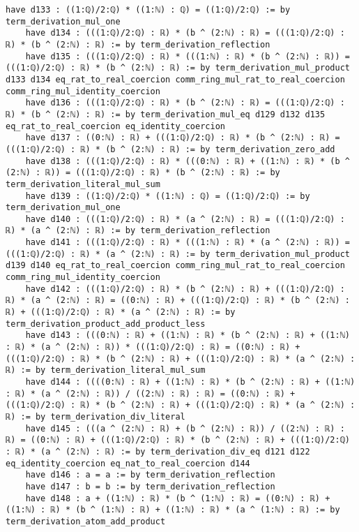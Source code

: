 \documentclass{article}
\begin{document}
\begin{tcolorbox}[colback=white!10, width=\linewidth]
\begin{lstlisting}[language=Lean4]
    have d133 : ((1:ℚ)/2:ℚ) * ((1:ℕ) : ℚ) = ((1:ℚ)/2:ℚ) := by term_derivation_mul_one
    have d134 : (((1:ℚ)/2:ℚ) : ℝ) * (b ^ (2:ℕ) : ℝ) = (((1:ℚ)/2:ℚ) : ℝ) * (b ^ (2:ℕ) : ℝ) := by term_derivation_reflection
    have d135 : (((1:ℚ)/2:ℚ) : ℝ) * (((1:ℕ) : ℝ) * (b ^ (2:ℕ) : ℝ)) = (((1:ℚ)/2:ℚ) : ℝ) * (b ^ (2:ℕ) : ℝ) := by term_derivation_mul_product d133 d134 eq_rat_to_real_coercion comm_ring_mul_rat_to_real_coercion comm_ring_mul_identity_coercion
    have d136 : (((1:ℚ)/2:ℚ) : ℝ) * (b ^ (2:ℕ) : ℝ) = (((1:ℚ)/2:ℚ) : ℝ) * (b ^ (2:ℕ) : ℝ) := by term_derivation_mul_eq d129 d132 d135 eq_rat_to_real_coercion eq_identity_coercion
    have d137 : ((0:ℕ) : ℝ) + (((1:ℚ)/2:ℚ) : ℝ) * (b ^ (2:ℕ) : ℝ) = (((1:ℚ)/2:ℚ) : ℝ) * (b ^ (2:ℕ) : ℝ) := by term_derivation_zero_add
    have d138 : (((1:ℚ)/2:ℚ) : ℝ) * (((0:ℕ) : ℝ) + ((1:ℕ) : ℝ) * (b ^ (2:ℕ) : ℝ)) = (((1:ℚ)/2:ℚ) : ℝ) * (b ^ (2:ℕ) : ℝ) := by term_derivation_literal_mul_sum
    have d139 : ((1:ℚ)/2:ℚ) * ((1:ℕ) : ℚ) = ((1:ℚ)/2:ℚ) := by term_derivation_mul_one
    have d140 : (((1:ℚ)/2:ℚ) : ℝ) * (a ^ (2:ℕ) : ℝ) = (((1:ℚ)/2:ℚ) : ℝ) * (a ^ (2:ℕ) : ℝ) := by term_derivation_reflection
    have d141 : (((1:ℚ)/2:ℚ) : ℝ) * (((1:ℕ) : ℝ) * (a ^ (2:ℕ) : ℝ)) = (((1:ℚ)/2:ℚ) : ℝ) * (a ^ (2:ℕ) : ℝ) := by term_derivation_mul_product d139 d140 eq_rat_to_real_coercion comm_ring_mul_rat_to_real_coercion comm_ring_mul_identity_coercion
    have d142 : (((1:ℚ)/2:ℚ) : ℝ) * (b ^ (2:ℕ) : ℝ) + (((1:ℚ)/2:ℚ) : ℝ) * (a ^ (2:ℕ) : ℝ) = ((0:ℕ) : ℝ) + (((1:ℚ)/2:ℚ) : ℝ) * (b ^ (2:ℕ) : ℝ) + (((1:ℚ)/2:ℚ) : ℝ) * (a ^ (2:ℕ) : ℝ) := by term_derivation_product_add_product_less
    have d143 : (((0:ℕ) : ℝ) + ((1:ℕ) : ℝ) * (b ^ (2:ℕ) : ℝ) + ((1:ℕ) : ℝ) * (a ^ (2:ℕ) : ℝ)) * (((1:ℚ)/2:ℚ) : ℝ) = ((0:ℕ) : ℝ) + (((1:ℚ)/2:ℚ) : ℝ) * (b ^ (2:ℕ) : ℝ) + (((1:ℚ)/2:ℚ) : ℝ) * (a ^ (2:ℕ) : ℝ) := by term_derivation_literal_mul_sum
    have d144 : ((((0:ℕ) : ℝ) + ((1:ℕ) : ℝ) * (b ^ (2:ℕ) : ℝ) + ((1:ℕ) : ℝ) * (a ^ (2:ℕ) : ℝ)) / ((2:ℕ) : ℝ) : ℝ) = ((0:ℕ) : ℝ) + (((1:ℚ)/2:ℚ) : ℝ) * (b ^ (2:ℕ) : ℝ) + (((1:ℚ)/2:ℚ) : ℝ) * (a ^ (2:ℕ) : ℝ) := by term_derivation_div_literal
    have d145 : (((a ^ (2:ℕ) : ℝ) + (b ^ (2:ℕ) : ℝ)) / ((2:ℕ) : ℝ) : ℝ) = ((0:ℕ) : ℝ) + (((1:ℚ)/2:ℚ) : ℝ) * (b ^ (2:ℕ) : ℝ) + (((1:ℚ)/2:ℚ) : ℝ) * (a ^ (2:ℕ) : ℝ) := by term_derivation_div_eq d121 d122 eq_identity_coercion eq_nat_to_real_coercion d144
    have d146 : a = a := by term_derivation_reflection
    have d147 : b = b := by term_derivation_reflection
    have d148 : a + ((1:ℕ) : ℝ) * (b ^ (1:ℕ) : ℝ) = ((0:ℕ) : ℝ) + ((1:ℕ) : ℝ) * (b ^ (1:ℕ) : ℝ) + ((1:ℕ) : ℝ) * (a ^ (1:ℕ) : ℝ) := by term_derivation_atom_add_product

\end{lstlisting}
\end{tcolorbox}
\end{document}
